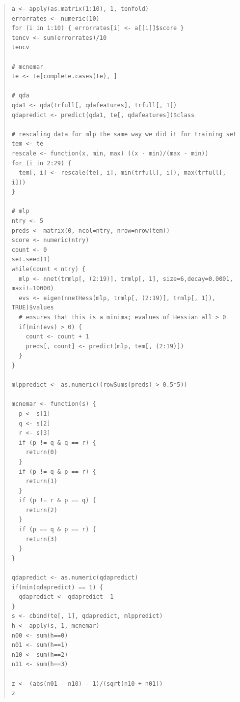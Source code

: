 \documentclass[11pt, a4paper]{article}
\begin{document}
\begin{quote}
\begin{verbatim}
a <- apply(as.matrix(1:10), 1, tenfold)
errorrates <- numeric(10)
for (i in 1:10) { errorrates[i] <- a[[i]]$score }
tencv <- sum(errorrates)/10
tencv

# mcnemar
te <- te[complete.cases(te), ]

# qda
qda1 <- qda(trfull[, qdafeatures], trfull[, 1])
qdapredict <- predict(qda1, te[, qdafeatures])$class

# rescaling data for mlp the same way we did it for training set
tem <- te
rescale <- function(x, min, max) ((x - min)/(max - min))
for (i in 2:29) {
  tem[, i] <- rescale(te[, i], min(trfull[, i]), max(trfull[, i]))
}

# mlp
ntry <- 5
preds <- matrix(0, ncol=ntry, nrow=nrow(tem))
score <- numeric(ntry)
count <- 0
set.seed(1)
while(count < ntry) {
  mlp <- nnet(trmlp[, (2:19)], trmlp[, 1], size=6,decay=0.0001, maxit=10000)
  evs <- eigen(nnetHess(mlp, trmlp[, (2:19)], trmlp[, 1]), TRUE)$values
  # ensures that this is a minima; evalues of Hessian all > 0
  if(min(evs) > 0) {
    count <- count + 1
    preds[, count] <- predict(mlp, tem[, (2:19)])
  }
}

mlppredict <- as.numeric((rowSums(preds) > 0.5*5))

mcnemar <- function(s) {
  p <- s[1]
  q <- s[2]
  r <- s[3]
  if (p != q & q == r) {
    return(0)
  }
  if (p != q & p == r) {
    return(1)
  }
  if (p != r & p == q) {
    return(2)
  }
  if (p == q & p == r) {
    return(3)
  }
}

qdapredict <- as.numeric(qdapredict)
if(min(qdapredict) == 1) {
  qdapredict <- qdapredict -1
}
s <- cbind(te[, 1], qdapredict, mlppredict)
h <- apply(s, 1, mcnemar)
n00 <- sum(h==0)
n01 <- sum(h==1)
n10 <- sum(h==2)
n11 <- sum(h==3)

z <- (abs(n01 - n10) - 1)/(sqrt(n10 + n01))
z
\end{verbatim}
\end{quote}
\end{document}
